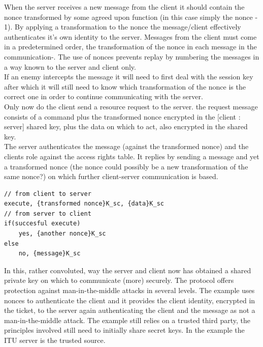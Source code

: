 When the server receives a new message from the client it should contain the nonce transformed by some agreed upon function (in this case simply the nonce - 1). By applying a transformation to the nonce the message/client effectively authenticates it's own identity to the server. Messages from the client must come in a predetermined order, the transformation of the nonce in each message in the communication-. The use of nonces prevents replay by numbering the messages in a way known to the server and client only. \\

If an enemy intercepts the message it will need to first deal with the session key after which it will still need to know which transformation of the nonce is the correct one in order to continue communicating with the server. \\

Only now do the client send a resource request to the server. the request message consists of a command plus the transformed nonce encrypted in the [client : server] shared key, plus the data on which to act, also encrypted in the shared key. \\

The server authenticates the message (against the transformed nonce) and the clients role against the access rights table. It replies by sending a message and yet a transformed nonce (the nonce could possibly be a new transformation of the same nonce?) on which further client-server communication is based.


\begin{lstlisting}
// from client to server
execute, {transformed nonce}K_sc, {data}K_sc
// from server to client
if(succesful execute)
	yes, {another nonce}K_sc
else
	no, {message}K_sc
\end{lstlisting}

In this, rather convoluted, way the server and client now has obtained a shared private key on which to communicate (more) securely. The protocol offers protection against man-in-the-middle attacks in several levels. The example uses nonces to authenticate the client and it provides the client identity, encrypted in the ticket, to the server again authenticating the client and the message as not a man-in-the-middle attack. The example still relies on a trusted third party, the principles involved still need to initially share secret keys. In the example the ITU server is the trusted source. \\
 
